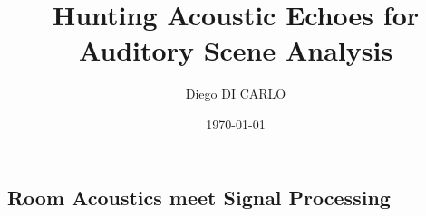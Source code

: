 \documentclass[pdftex,dvipsnames]{dissertation}
\title{Hunting Acoustic Echoes for Auditory Scene Analysis}
\author{Diego DI CARLO}
\date{\today}
\begin{document}
\frontmatter{}

% 


\blankpage{}


\blankpage{}
\clearpage

\begin{otherlanguage}{french}

\end{otherlanguage}
\blankpage{}
\clearpage

\begin{otherlanguage}{french}

\end{otherlanguage}
\clearpage
\blankpage{}


% 

\doparttoc[n]
\tableofcontents*{}
\clearpage


\clearpage
\blankpage




\cleardoublepage{}


\setcounter{mtc}{9}
\mainmatter{}


\cleardoublepage

\begin{fullwidth}
    \part{Room Acoustics meet Signal Processing}\label{pt:background}
\end{fullwidth}
\parttoc[n]
\end{document}
